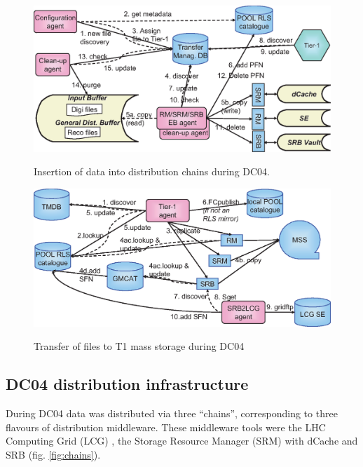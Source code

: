 \documentclass{cmspaper}
\begin{document}
\begin{figure}[tbp]
\centering
\includegraphics[angle = 90]{T0-flow-2.eps} 
\label{fig:flow2}
\caption{Insertion of data into distribution chains during DC04.}
\end{figure}

\begin{figure}[tbp]
\centering
\includegraphics[angle = 90]{T1-flow.eps} 
\label{fig:flow3}
\caption{Transfer of files to T1 mass storage during DC04}
\end{figure}

\subsection{DC04 distribution infrastructure}
During DC04 data was distributed via three ``chains'', corresponding
to three flavours of distribution middleware. These middleware tools
were the LHC Computing Grid (LCG) \cite{lcg}, the Storage Resource
Manager (SRM) \cite{srm} with dCache \cite{dcache} and SRB \cite{srb}
(fig. \ref{fig:chains}).
\end{document}
